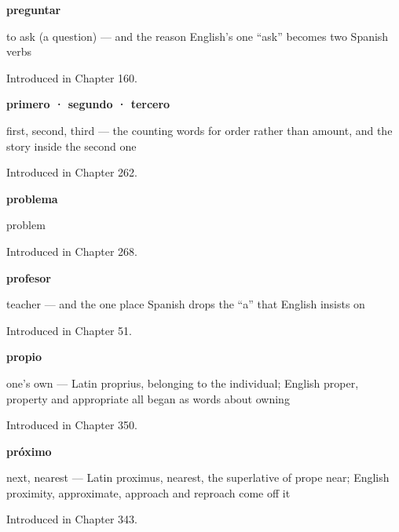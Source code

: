 \noindent\begin{minipage}[t]{\linewidth}
\raggedright
\textbf{preguntar}\par
\small to ask (a question) — and the reason English's one \textquotedblleft{}ask\textquotedblright{} becomes two Spanish verbs\par
\footnotesize Introduced in Chapter 160.
\end{minipage}\par\medskip

\noindent\begin{minipage}[t]{\linewidth}
\raggedright
\textbf{primero · segundo · tercero}\par
\small first, second, third — the counting words for order rather than amount, and the story inside the second one\par
\footnotesize Introduced in Chapter 262.
\end{minipage}\par\medskip

\noindent\begin{minipage}[t]{\linewidth}
\raggedright
\textbf{problema}\par
\small problem\par
\footnotesize Introduced in Chapter 268.
\end{minipage}\par\medskip

\noindent\begin{minipage}[t]{\linewidth}
\raggedright
\textbf{profesor}\par
\small teacher — and the one place Spanish drops the \textquotedblleft{}a\textquotedblright{} that English insists on\par
\footnotesize Introduced in Chapter 51.
\end{minipage}\par\medskip

\noindent\begin{minipage}[t]{\linewidth}
\raggedright
\textbf{propio}\par
\small one's own — Latin proprius, belonging to the individual; English proper, property and appropriate all began as words about owning\par
\footnotesize Introduced in Chapter 350.
\end{minipage}\par\medskip

\noindent\begin{minipage}[t]{\linewidth}
\raggedright
\textbf{próximo}\par
\small next, nearest — Latin proximus, nearest, the superlative of prope near; English proximity, approximate, approach and reproach come off it\par
\footnotesize Introduced in Chapter 343.
\end{minipage}\par\medskip

